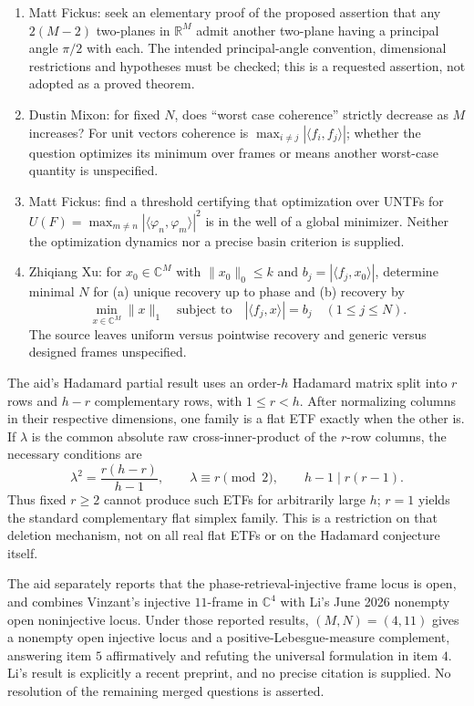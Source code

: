 \documentclass[11pt]{article}
\newcommand{\R}{\mathbb{R}}
\newcommand{\C}{\mathbb{C}}
\begin{document}
\begin{enumerate}
\item Matt Fickus: seek an elementary proof of the proposed assertion that any \(2(M-2)\) two-planes in \(\R^M\) admit another two-plane having a principal angle \(\pi/2\) with each. The intended principal-angle convention, dimensional restrictions and hypotheses must be checked; this is a requested assertion, not adopted as a proved theorem.
\item Dustin Mixon: for fixed \(N\), does ``worst case coherence'' strictly decrease as \(M\) increases? For unit vectors coherence is \(\max_{i\ne j}|\langle f_i,f_j\rangle|\); whether the question optimizes its minimum over frames or means another worst-case quantity is unspecified.
\item Matt Fickus: find a threshold certifying that optimization over UNTFs for
\(U(F)=\max_{m\ne n}|\langle\varphi_n,\varphi_m\rangle|^2\)
is in the well of a global minimizer. Neither the optimization dynamics nor a precise basin criterion is supplied.
\item Zhiqiang Xu: for \(x_0\in\C^M\) with \(\|x_0\|_0\leq k\) and \(b_j=|\langle f_j,x_0\rangle|\), determine minimal \(N\) for (a) unique recovery up to phase and (b) recovery by
\[
 \min_{x\in\C^M}\|x\|_1\quad\text{subject to}\quad
 |\langle f_j,x\rangle|=b_j\quad(1\leq j\leq N).
\]
The source leaves uniform versus pointwise recovery and generic versus designed frames unspecified.
\end{enumerate}

The aid's Hadamard partial result uses an order-\(h\) Hadamard matrix split into \(r\) rows and \(h-r\) complementary rows, with \(1\leq r<h\). After normalizing columns in their respective dimensions, one family is a flat ETF exactly when the other is. If \(\lambda\) is the common absolute raw cross-inner-product of the \(r\)-row columns, the necessary conditions are
\[
 \lambda^2=\frac{r(h-r)}{h-1},\qquad
 \lambda\equiv r\pmod2,\qquad h-1\mid r(r-1).
\]
Thus fixed \(r\geq2\) cannot produce such ETFs for arbitrarily large \(h\); \(r=1\) yields the standard complementary flat simplex family. This is a restriction on that deletion mechanism, not on all real flat ETFs or on the Hadamard conjecture itself.

The aid separately reports that the phase-retrieval-injective frame locus is open, and combines Vinzant's injective \(11\)-frame in \(\C^4\) with Li's June 2026 nonempty open noninjective locus. Under those reported results, \((M,N)=(4,11)\) gives a nonempty open injective locus and a positive-Lebesgue-measure complement, answering item \(5\) affirmatively and refuting the universal formulation in item \(4\). Li's result is explicitly a recent preprint, and no precise citation is supplied. No resolution of the remaining merged questions is asserted.
\end{document}
